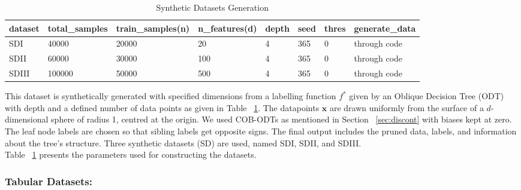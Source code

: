 \documentclass{article} %
\renewcommand{\>}{{\rightarrow}}
\renewcommand{\=}{\stackrel{\triangle}{=}}
\newcommand{\0}{{\mathbf 0}}
\newcommand{\x}{{\mathbf x}}
\begin{document}
\begin{table}[t]
\caption{Synthetic Datasets Generation}
\label{syn-data-gen}
\begin{center}
\begin{adjustbox}{width=0.99 \textwidth}
\begin{tabular}{|p{1cm}|p{1.75cm}|p{2.25cm}|p{1.75cm}|p{.75cm}|p{.75cm}|p{.75cm}|p{2cm}|}
\hline
dataset &total\_samples &train\_samples(n) &n\_features(d) &depth &seed &thres &generate\_data\\
 \hline
SDI    &40000 &20000 &20 &4 &365 &0 &through code\\
SDII   &60000 &30000 &100 &4 &365 &0 &through code\\
SDIII  &100000 &50000 &500 &4 &365 &0 &through code\\
\hline 
\end{tabular}
\end{adjustbox}
\end{center}
\end{table}
 
This dataset is synthetically generated with specified dimensions from a labelling function $f^*$ given by an Oblique Decision Tree (ODT) with depth and a defined number of data points as given in Table ~\ref{syn-data-gen}. The datapoints $\x$ are drawn uniformly from the surface of a $d$-dimensional sphere of radius 1, centred at the origin. We used COB-ODTs as mentioned in Section ~\ref{sec:discont} with biases kept at zero. The leaf node labels are chosen so that sibling labels get opposite signs. The final output includes the pruned data, labels, and information about the tree's structure. Three synthetic datasets (SD) are used, named SDI, SDII, and SDIII.\\
Table ~\ref{syn-data-gen} presents the parameters used for constructing the datasets.

\subsubsection{Tabular Datasets:}
\end{document}
